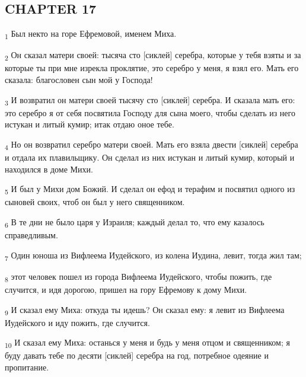 \subsection{CHAPTER 17}
\begin{tcolorbox}
\textsubscript{1} Был некто на горе Ефремовой, именем Миха.
\end{tcolorbox}
\begin{tcolorbox}
\textsubscript{2} Он сказал матери своей: тысяча сто [сиклей] серебра, которые у тебя взяты и за которые ты при мне изрекла проклятие, это серебро у меня, я взял его. Мать его сказала: благословен сын мой у Господа!
\end{tcolorbox}
\begin{tcolorbox}
\textsubscript{3} И возвратил он матери своей тысячу сто [сиклей] серебра. И сказала мать его: это серебро я от себя посвятила Господу для сына моего, чтобы сделать из него истукан и литый кумир; итак отдаю оное тебе.
\end{tcolorbox}
\begin{tcolorbox}
\textsubscript{4} Но он возвратил серебро матери своей. Мать его взяла двести [сиклей] серебра и отдала их плавильщику. Он сделал из них истукан и литый кумир, который и находился в доме Михи.
\end{tcolorbox}
\begin{tcolorbox}
\textsubscript{5} И был у Михи дом Божий. И сделал он ефод и терафим и посвятил одного из сыновей своих, чтоб он был у него священником.
\end{tcolorbox}
\begin{tcolorbox}
\textsubscript{6} В те дни не было царя у Израиля; каждый делал то, что ему казалось справедливым.
\end{tcolorbox}
\begin{tcolorbox}
\textsubscript{7} Один юноша из Вифлеема Иудейского, из колена Иудина, левит, тогда жил там;
\end{tcolorbox}
\begin{tcolorbox}
\textsubscript{8} этот человек пошел из города Вифлеема Иудейского, чтобы пожить, где случится, и идя дорогою, пришел на гору Ефремову к дому Михи.
\end{tcolorbox}
\begin{tcolorbox}
\textsubscript{9} И сказал ему Миха: откуда ты идешь? Он сказал ему: я левит из Вифлеема Иудейского и иду пожить, где случится.
\end{tcolorbox}
\begin{tcolorbox}
\textsubscript{10} И сказал ему Миха: останься у меня и будь у меня отцом и священником; я буду давать тебе по десяти [сиклей] серебра на год, потребное одеяние и пропитание.
\end{tcolorbox}
